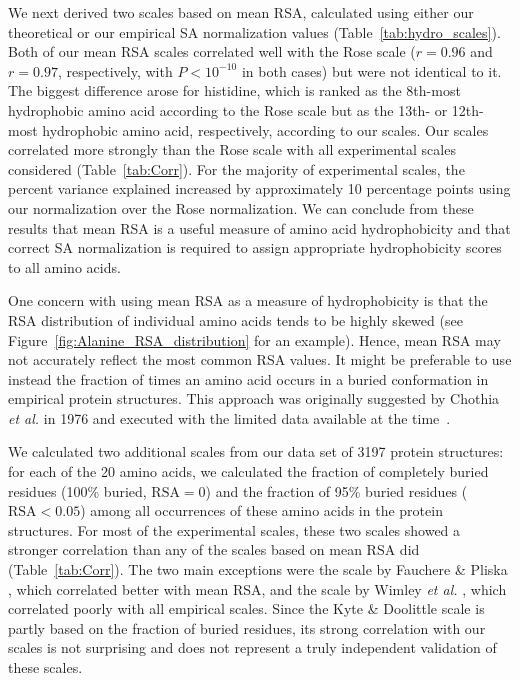 \documentclass[11pt]{article}
\begin{document}
We next derived two scales based on mean RSA, calculated using either our theoretical or our empirical SA normalization values (Table~\ref{tab:hydro_scales}). Both of our mean RSA scales correlated well with the Rose scale ($r=0.96$ and $r=0.97$, respectively, with $P<10^{-10}$ in both cases) but were not identical to it. The biggest difference arose for histidine, which is ranked as the 8th-most hydrophobic amino acid according to the Rose scale but as the 13th- or 12th-most hydrophobic amino acid, respectively, according to our scales. Our scales correlated more strongly than the Rose scale with all experimental scales considered (Table~\ref{tab:Corr}). For the majority of experimental scales, the percent variance explained increased by approximately 10 percentage points using our normalization over the Rose normalization. We can conclude from these results that mean RSA is a useful measure of amino acid hydrophobicity and that correct SA normalization is required to assign appropriate hydrophobicity scores to all amino acids.

One concern with using mean RSA as a measure of hydrophobicity is that the RSA distribution of individual amino acids tends to be highly skewed (see Figure~\ref{fig:Alanine_RSA_distribution} for an example). Hence, mean RSA may not accurately reflect the most common RSA values. It might be preferable to use instead the fraction of times an amino acid occurs in a buried conformation in empirical protein structures. This approach was originally suggested by Chothia \emph{et al.} in 1976 and executed with the limited data available at the time~\cite{Chothia1976}.

We calculated two additional scales from our data set of 3197 protein structures: for each of the 20 amino acids, we calculated the fraction of completely buried residues (100\% buried, $\text{RSA}=0$) and the fraction of 95\% buried residues ($\text{RSA}<0.05$) among all occurrences of these amino acids in the protein structures. For most of the experimental scales, these two scales showed a stronger correlation than any of the scales based on mean RSA did (Table~\ref{tab:Corr}). The two main exceptions were the scale by Fauchere \& Pliska \cite{Fauchere1983}, which correlated better with mean RSA, and the scale by Wimley \emph{et al.} \cite{Wimley1996}, which correlated poorly with all empirical scales. Since the Kyte \& Doolittle scale \cite{Kyte1981} is partly based on the fraction of buried residues, its strong correlation with our scales is not surprising and does not represent a truly independent validation of these scales.
\end{document}
